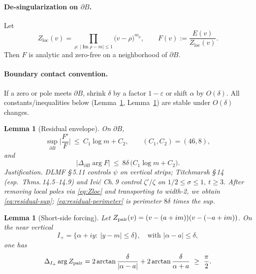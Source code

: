 \documentclass[11pt]{article}
\numberwithin{equation}{section}
\newtheorem{lemma}[theorem]{Lemma}
\theoremstyle{remark}
\DeclareMathOperator{\Imag}{Im}
\newcommand{\Zloc}{Z_{\mathrm{loc}}}
\begin{document}
\paragraph{De-singularization on $\partial B$.}
Let
\begin{equation}\label{eq:Zloc}
\Zloc(v)=\prod_{\rho:\,|\Imag\rho-m|\le 1}\bigl(v-\rho\bigr)^{m_\rho},\qquad
F(v):=\frac{E(v)}{\Zloc(v)}.
\end{equation}
Then $F$ is analytic and zero-free on a neighborhood of $\partial B$.

\paragraph{Boundary contact convention.}
If a zero or pole meets $\partial B$, shrink $\delta$ by a factor $1-\varepsilon$ or shift $\alpha$ by $O(\delta)$. All constants/inequalities below (Lemma~\ref{lem:residual}, Lemma~\ref{lem:short-side}) are stable under $O(\delta)$ changes.

\begin{lemma}[Residual envelope]\label{lem:residual}
On $\partial B$,
\begin{equation}\label{eq:residual-sup}
\sup_{\partial B}\Big|\frac{F'}{F}\Big|\ \le\ C_1\log m + C_2,\qquad (C_1,C_2)=(46,8),
\end{equation}
and
\begin{equation}\label{eq:residual-perimeter}
\big|\Delta_{\partial B}\arg F\big|\ \le\ 8\delta\,\big(C_1\log m+C_2\big).
\end{equation}
\emph{Justification.} DLMF §\,5.11 controls $\psi$ on vertical strips; Titchmarsh §\,14 (esp.\ Thms.\,14.5–14.9) and Ivi\'c Ch.\,9 control $\zeta'/\zeta$ on $1/2\le\sigma\le 1,\ t\ge 3$. After removing local poles via \eqref{eq:Zloc} and transporting to width-2, we obtain \eqref{eq:residual-sup}; \eqref{eq:residual-perimeter} is perimeter $8\delta$ times the sup.
\end{lemma}

\begin{lemma}[Short-side forcing]\label{lem:short-side}
Let $Z_{\rm pair}(v)=(v-(a+im))(v-(-a+im))$. On the near vertical
\[
I_+=\{\alpha+i y:\ |y-m|\le \delta\},\quad\text{with }|\alpha-a|\le\delta,
\]
one has
\begin{equation}\label{eq:short-side}
\Delta_{I_+}\arg Z_{\rm pair}
=2\arctan\frac{\delta}{|\alpha-a|}+2\arctan\frac{\delta}{\alpha+a}\ \ge\ \frac{\pi}{2}.
\end{equation}
\end{lemma}
\end{document}
